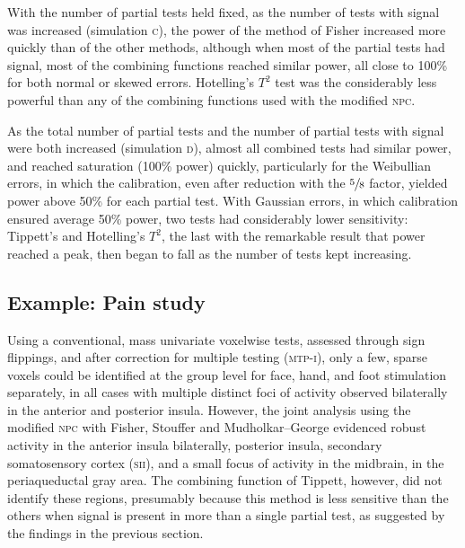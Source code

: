 With the number of partial tests held fixed, as the number of tests with signal was increased (simulation \textsc{c}), the power of the method of Fisher increased more quickly than of the other methods, although when most of the partial tests had signal, most of the combining functions reached similar power, all close to 100\% for both normal or skewed errors. Hotelling's $T^2$ test was the considerably less powerful than any of the combining functions used with the modified \textsc{npc}.

As the total number of partial tests and the number of partial tests with signal were both increased (simulation \textsc{d}), almost all combined tests had similar power, and reached saturation (100\% power) quickly, particularly for the Weibullian errors, in which the calibration, even after reduction with the $\sfrac{5}{8}$ factor, yielded power above 50\% for each partial test. With Gaussian errors, in which calibration ensured average 50\% power, two tests had considerably lower sensitivity: Tippett's and Hotelling's $T^2$, the last with the remarkable result that power reached a peak, then began to fall as the number of tests kept increasing.

\subsection{Example: Pain study}

Using a conventional, mass univariate voxelwise tests, assessed through sign flippings, and after correction for multiple testing (\textsc{mtp-i}), only a few, sparse voxels could be identified at the group level for face, hand, and foot stimulation separately, in all cases with multiple distinct foci of activity observed bilaterally in the anterior and posterior insula. However, the joint analysis using the modified \textsc{npc} with Fisher, Stouffer and Mudholkar--George evidenced robust activity in the anterior insula bilaterally, posterior insula, secondary somatosensory cortex (\textsc{sii}), and a small focus of activity in the midbrain, in the periaqueductal gray area. The combining function of Tippett, however, did not identify these regions, presumably because this method is less sensitive than the others when signal is present in more than a single partial test, as suggested by the findings in the previous section.

